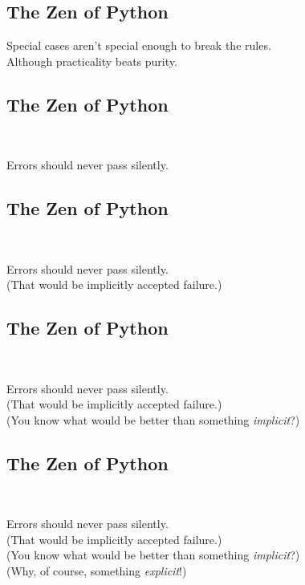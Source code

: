 \documentclass[xga]{xdvislides}
\begin{document}
\subsection{The Zen of Python}
\begin{center}
    Special cases aren't special enough to break the rules. \\
\addvspace{.5in}
    Although practicality beats purity.
\end{center}

\subsection{The Zen of Python}
\\
\begin{center}
    Errors should never pass silently.
\end{center}

\subsection{The Zen of Python}
\\
\begin{center}
    Errors should never pass silently. \\
\addvspace{.2in}
	\small
	(That would be implicitly accepted failure.)
\end{center}
\Huge

\subsection{The Zen of Python}
\\
\begin{center}
    Errors should never pass silently. \\
\addvspace{.2in}
	\small
	(That would be implicitly accepted failure.) \\
\addvspace{.2in}
	(You know what would be better than something {\em implicit}?)
\end{center}

\subsection{The Zen of Python}
\\
\begin{center}
    Errors should never pass silently. \\
\addvspace{.2in}
	\small
	(That would be implicitly accepted failure.) \\
\addvspace{.2in}
	(You know what would be better than something {\em implicit}?) \\
\addvspace{.2in}
	(Why, of course, something {\em explicit}!)
\end{center}
\end{document}
